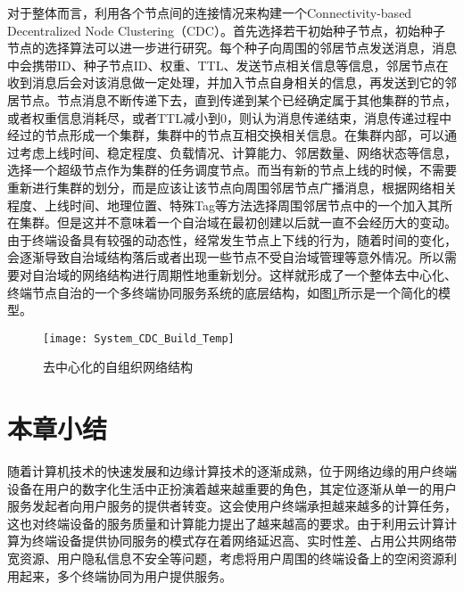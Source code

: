 对于整体而言，利用各个节点间的连接情况来构建一个Connectivity-based Decentralized Node Clustering（CDC）。首先选择若干初始种子节点，初始种子节点的选择算法可以进一步进行研究。每个种子向周围的邻居节点发送消息，消息中会携带ID、种子节点ID、权重、TTL、发送节点相关信息等信息，邻居节点在收到消息后会对该消息做一定处理，并加入节点自身相关的信息，再发送到它的邻居节点。节点消息不断传递下去，直到传递到某个已经确定属于其他集群的节点，或者权重信息消耗尽，或者TTL减小到0，则认为消息传递结束，消息传递过程中经过的节点形成一个集群，集群中的节点互相交换相关信息。在集群内部，可以通过考虑上线时间、稳定程度、负载情况、计算能力、邻居数量、网络状态等信息，选择一个超级节点作为集群的任务调度节点。而当有新的节点上线的时候，不需要重新进行集群的划分，而是应该让该节点向周围邻居节点广播消息，根据网络相关程度、上线时间、地理位置、特殊Tag等方法选择周围邻居节点中的一个加入其所在集群。但是这并不意味着一个自治域在最初创建以后就一直不会经历大的变动。由于终端设备具有较强的动态性，经常发生节点上下线的行为，随着时间的变化，会逐渐导致自治域结构落后或者出现一些节点不受自治域管理等意外情况。所以需要对自治域的网络结构进行周期性地重新划分\cite{刘福杰2004一种自组织网络管理实现方法的研究}。这样就形成了一个整体去中心化、终端节点自治的一个多终端协同服务系统的底层结构，如图\ref{fig:system_cdc_build}所示是一个简化的模型。
\begin{figure}[!htbp]
    \centering
    \texttt{[image: System\_CDC\_Build\_Temp]}
    \caption{去中心化的自组织网络结构}
    \label{fig:system_cdc_build}
\end{figure}




\section{本章小结}\label{sec:service_system_summary}

随着计算机技术的快速发展和边缘计算技术的逐渐成熟，位于网络边缘的用户终端设备在用户的数字化生活中正扮演着越来越重要的角色，其定位逐渐从单一的用户服务发起者向用户服务的提供者转变。这会使用户终端承担越来越多的计算任务，这也对终端设备的服务质量和计算能力提出了越来越高的要求。由于利用云计算计算为终端设备提供协同服务的模式存在着网络延迟高、实时性差、占用公共网络带宽资源、用户隐私信息不安全等问题，考虑将用户周围的终端设备上的空闲资源利用起来，多个终端协同为用户提供服务。


